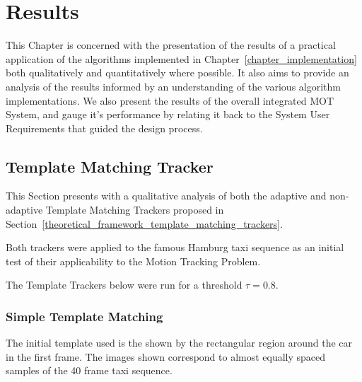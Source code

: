 \chapter{Results}\label{chapter_results}

This Chapter is concerned with the presentation of the results of a practical
application of the algorithms implemented in
Chapter~\ref{chapter_implementation} both qualitatively and quantitatively where
possible. It also aims to provide an analysis of the results informed by an
understanding of the various algorithm implementations.
We also present the results of the overall integrated MOT System, and gauge it's
performance by relating it back to the System User Requirements that guided the
design process.

\section{Template Matching Tracker}
This Section presents with a qualitative analysis of both the adaptive and
non-adaptive Template Matching Trackers proposed in
Section~\ref{theoretical_framework_template_matching_trackers}. 

Both trackers were applied to the famous Hamburg taxi sequence \cite{} as an initial
test of their applicability to the Motion Tracking Problem.

The Template Trackers below were run for a threshold $\tau=0.8$.

\subsection{Simple Template Matching}\label{results_simple_template_matching}
The initial template used is the shown by the rectangular region around the car
in the first frame. The images shown correspond to almost equally spaced
samples of the 40 frame taxi sequence.

